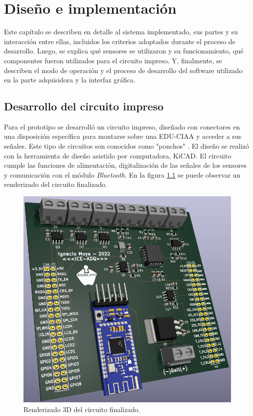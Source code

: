 \chapter{Diseño e implementación} %

\label{Chapter3}

Este capítulo se describen en detalle al sistema implementado, sus partes y su interacción entre ellas, incluidos los criterios adoptados durante el proceso de desarrollo. Luego, se explica qué sensores se utilizaron y su funcionamiento, qué componentes fueron utilizados para el circuito impreso. Y, finalmente, se describen el modo de operación y el proceso de desarrollo del software utilizado en la parte adquisidora y la interfaz gráfica.

\section{Desarrollo del circuito impreso} \label{circuito}

Para el prototipo se desarrolló un circuito impreso, diseñado con conectores en una disposición específica para montarse sobre una EDU-CIAA y acceder a sus señales. Este tipo de circuitos son conocidos como "ponchos" \cite{poncho}. El diseño se realizó con la herramienta de diseño asistido por computadora, KiCAD. El circuito cumple las funciones de alimentación, digitalización de las señales de los sensores y comunicación con el módulo \textit{Bluetooth}. En la figura \ref{fig:circuito-3d} se puede observar un renderizado del circuito finalizado. 

\begin{figure}[htpb]
\centering
\includegraphics[width=.8\textwidth]{./Figures/circuito-3d.png}
\caption{Renderizado 3D del circuito finalizado.}
\label{fig:circuito-3d}
\end{figure}


